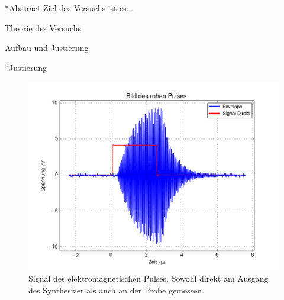 \documentclass[pdftex, a4paper,11pt, twoside, ngerman]{report}
\begin{document}
  
  
  
  
  
  
  
  
  \begin{chapter}*{Abstract}
    Ziel des Versuchs ist es...
    
    
  \end{chapter}
  
  \tableofcontents
  
  
  
  \begin{chapter}{Theorie des Versuchs}
    \label{chp:Theorie}
    
    
    
  \end{chapter}
  
  
  
  \begin{chapter}{Aufbau und Justierung}
    \label{chpAufbau}
    
    
    
    \begin{section}*{Justierung}
      \label{chpAufbauJustierung}
      
      \begin{figure}[htb]
        \centering
        \includegraphics[width=\textwidth]{Figures/RohPuls1.png}
        \caption{Signal des elektromagnetischen Pulses.
          Sowohl direkt am Ausgang des Synthesizer als auch an der Probe
          gemessen.}
        \label{figRohPuls}
      \end{figure}

      
    \end{section}
    
  \end{chapter}
  
\end{document}
